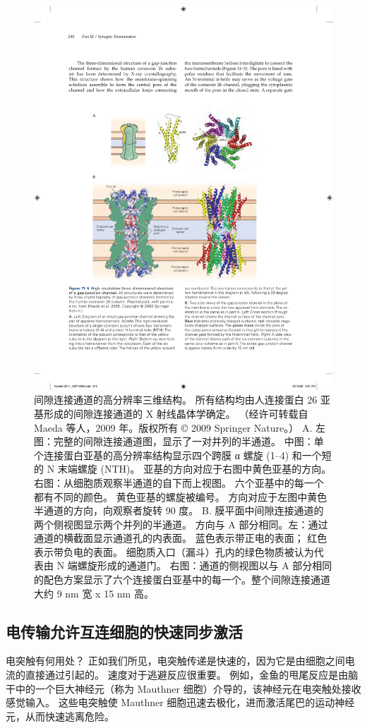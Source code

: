\begin{figure}[htbp]
	\centering
	\includegraphics[width=0.7\linewidth]{chap11/fig_11_5}
	\caption{间隙连接通道的高分辨率三维结构。 所有结构均由人连接蛋白 26 亚基形成的间隙连接通道的 X 射线晶体学确定。 （经许可转载自 Maeda 等人，2009 年。版权所有 © 2009 Springer Nature。） A. 左图：完整的间隙连接通道图，显示了一对并列的半通道。 中图：单个连接蛋白亚基的高分辨率结构显示四个跨膜 α 螺旋 (1–4) 和一个短的 N 末端螺旋 (NTH)。 亚基的方向对应于右图中黄色亚基的方向。 右图：从细胞质观察半通道的自下而上视图。 六个亚基中的每一个都有不同的颜色。 黄色亚基的螺旋被编号。 方向对应于左图中黄色半通道的方向，向观察者旋转 90 度。 B. 膜平面中间隙连接通道的两个侧视图显示两个并列的半通道。 方向与 A 部分相同。左：通过通道的横截面显示通道孔的内表面。 蓝色表示带正电的表面； 红色表示带负电的表面。 细胞质入口（漏斗）孔内的绿色物质被认为代表由 N 端螺旋形成的通道门。 右图：通道的侧视图以与 A 部分相同的配色方案显示了六个连接蛋白亚基中的每一个。整个间隙连接通道大约 9 nm 宽 x 15 nm 高。}
	\label{fig:11_5}
\end{figure}


\subsection{电传输允许互连细胞的快速同步激活}
电突触有何用处？ 
正如我们所见，电突触传递是快速的，因为它是由细胞之间电流的直接通过引起的。 
速度对于逃避反应很重要。 
例如，金鱼的甩尾反应是由脑干中的一个巨大神经元（称为 Mauthner 细胞）介导的，该神经元在电突触处接收感觉输入。 
这些电突触使 Mauthner 细胞迅速去极化，进而激活尾巴的运动神经元，从而快速逃离危险。


